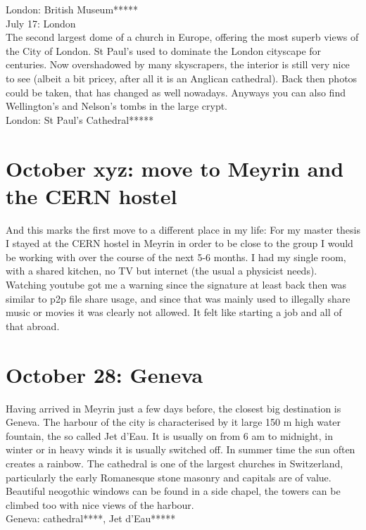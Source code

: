 London: British Museum*****\\

July 17: London\\
The second largest dome of a church in Europe, offering the most superb views of the City of London. St Paul's used to dominate the London cityscape for centuries. Now overshadowed by many skyscrapers, the interior is still very nice to see (albeit a bit pricey, after all it is an Anglican cathedral). Back then photos could be taken, that has changed as well nowadays. Anyways you can also find Wellington's and Nelson's tombs in the large crypt.\\

London: St Paul's Cathedral*****

\section{October xyz: move to Meyrin and the CERN hostel}
\label{moveMeyrin}

And this marks the first move to a different place in my life: For my master thesis I stayed at the CERN hostel in Meyrin in order to be close to the group I would be working with over the course of the next 5-6 months. I had my single room, with a shared kitchen, no TV but internet (the usual a physicist needs). Watching youtube got me a warning since the signature at least back then was similar to p2p file share usage, and since that was mainly used to illegally share music or movies it was clearly not allowed. It felt like starting a job and all of that abroad.

\section{October 28: Geneva}
\label{2006:Geneva}

Having arrived in Meyrin just a few days before, the closest big destination is Geneva. The harbour of the city is characterised by it large 150 m high water fountain, the so called Jet d'Eau. It is usually on from 6 am to midnight, in winter or in heavy winds it is usually switched off. In summer time the sun often creates a rainbow. The cathedral is one of the largest churches in Switzerland, particularly the early Romanesque stone masonry and capitals are of value. Beautiful neogothic windows can be found in a side chapel, the towers can be climbed too with nice views of the harbour.\\

Geneva: cathedral****, Jet d'Eau*****


